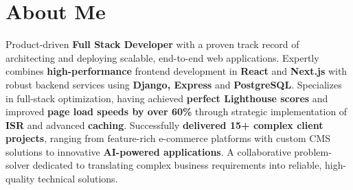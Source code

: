 \section{About Me}
    \begin{onecolentry}
        Product-driven \textbf{Full Stack Developer} with a proven track record of architecting and deploying scalable, end-to-end web applications. Expertly combines \textbf{high-performance} frontend development in \textbf{React} and \textbf{Next.js} with robust backend services using \textbf{Django, Express} and \textbf{PostgreSQL}. Specializes in full-stack optimization, having achieved \textbf{perfect Lighthouse scores} and improved \textbf{page load speeds by over 60\%} through strategic implementation of \textbf{ISR} and advanced \textbf{caching}. Successfully \textbf{delivered 15+ complex client projects}, ranging from feature-rich e-commerce platforms with custom CMS solutions to innovative \textbf{AI-powered applications}. A collaborative problem-solver dedicated to translating complex business requirements into reliable, high-quality technical solutions.
    \end{onecolentry}
